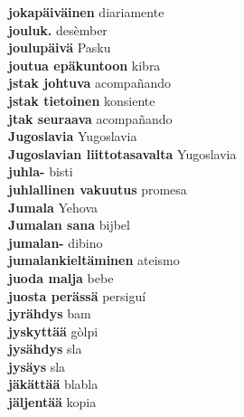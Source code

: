\textbf{ jokapäiväinen  } diariamente \\
\textbf{ jouluk.  } desèmber \\
\textbf{ joulupäivä  } Pasku \\
\textbf{ joutua epäkuntoon  } kibra \\
\textbf{ jstak johtuva  } acompañando \\
\textbf{ jstak tietoinen  } konsiente \\
\textbf{ jtak seuraava  } acompañando \\
\textbf{ Jugoslavia  } Yugoslavia \\
\textbf{ Jugoslavian liittotasavalta  } Yugoslavia \\
\textbf{ juhla-  } bisti \\
\textbf{ juhlallinen vakuutus  } promesa \\
\textbf{ Jumala  } Yehova \\
\textbf{ Jumalan sana  } bijbel \\
\textbf{ jumalan-  } dibino \\
\textbf{ jumalankieltäminen  } ateismo \\
\textbf{ juoda malja  } bebe \\
\textbf{ juosta perässä  } persiguí \\
\textbf{ jyrähdys  } bam \\
\textbf{ jyskyttää  } gòlpi \\
\textbf{ jysähdys  } sla \\
\textbf{ jysäys  } sla \\
\textbf{ jäkättää  } blabla \\
\textbf{ jäljentää  } kopia \\
